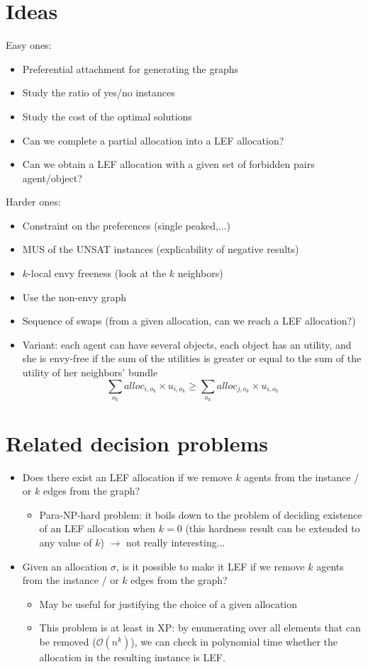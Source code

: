 \documentclass{article}
\begin{document}
\section{Ideas}
Easy ones:
\begin{itemize}
	\item Preferential attachment for generating the graphs
	\item Study the ratio of yes/no instances
	\item Study the cost of the optimal solutions
	\item Can we complete a partial allocation into a LEF allocation?
	\item Can we obtain a LEF allocation with a given set of forbidden pairs agent/object?
\end{itemize}

Harder ones:
\begin{itemize}
	\item Constraint on the preferences (single peaked,...)
	\item MUS of the UNSAT instances (explicability of negative results)
	\item $k$-local envy freeness (look at the $k$ neighbors)
	\item Use the non-envy graph
	\item Sequence of swaps (from a given allocation, can we reach a LEF allocation?)
	\item Variant: each agent can have several objects, each object has an utility, and she is envy-free if the sum of the utilities is greater or equal to the sum of the utility of her neighbors' bundle
	\[
	\sum_{o_k} alloc_{i,o_k} \times u_{i,o_k} \geq \sum_{o_k} alloc_{j,o_k} \times u_{i,o_k}
	\]
\end{itemize}

\section{Related decision problems}

\begin{itemize}
\item Does there exist an LEF allocation if we remove $k$ agents from the instance / or $k$ edges from the graph?
\begin{itemize}
\item Para-NP-hard problem: it boils down to the problem of deciding existence of an LEF allocation when $k=0$ (this hardness result can be extended to any value of $k$) $\rightarrow$ not really interesting...
\end{itemize}
\item Given an allocation $\sigma$, is it possible to make it LEF if we remove $k$ agents from the instance / or $k$ edges from the graph?
\begin{itemize}
\item May be useful for justifying the choice of a given allocation
\item This problem is at least in XP: by enumerating over all elements that can be removed ($\mathcal{O}(n^k)$), we can check in polynomial time whether the allocation in the resulting instance is LEF.
\end{itemize}
\end{itemize}
\end{document}
